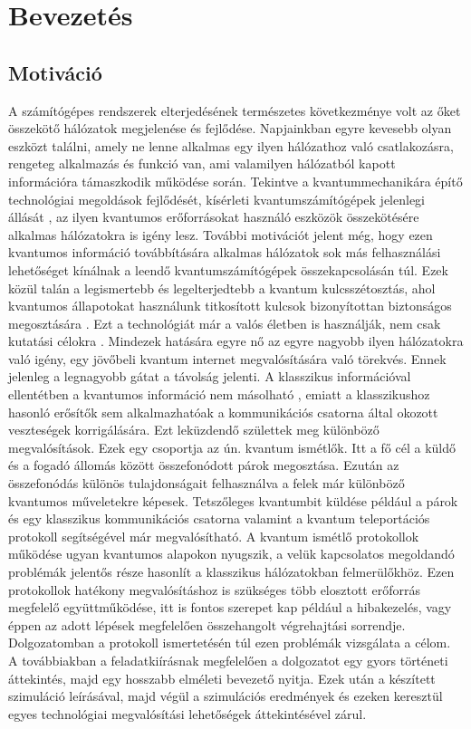 \chapter{Bevezetés}

\section{Motiváció}

A számítógépes rendszerek elterjedésének természetes következménye volt az őket összekötő hálózatok megjelenése és fejlődése. Napjainkban egyre kevesebb olyan eszközt találni, amely ne lenne alkalmas egy ilyen hálózathoz való csatlakozásra, rengeteg alkalmazás és funkció van, ami valamilyen hálózatból kapott információra támaszkodik működése során. Tekintve a kvantummechanikára építő technológiai megoldások fejlődését, kísérleti kvantumszámítógépek jelenlegi állását \cite{IBMQC}\cite{neill2017blueprint} , az ilyen kvantumos erőforrásokat használó eszközök összekötésére alkalmas hálózatokra is igény lesz. További motivációt jelent még, hogy ezen kvantumos információ továbbítására alkalmas hálózatok sok más felhasználási lehetőséget kínálnak a leendő kvantumszámítógépek összekapcsolásán túl. Ezek közül talán a legismertebb és legelterjedtebb a kvantum kulcsszétosztás, ahol kvantumos állapotokat használunk titkosított kulcsok bizonyítottan biztonságos megosztására \cite{BB84}. Ezt a technológiát már a valós életben is használják, nem csak kutatási célokra \cite{Swisselection}. Mindezek hatására egyre nő az egyre nagyobb ilyen hálózatokra való igény, egy jövőbeli kvantum internet \cite{kimble2008quantum} megvalósítására való törekvés. Ennek jelenleg a legnagyobb gátat a távolság jelenti. A klasszikus információval ellentétben a kvantumos információ nem másolható \cite{wootters1982single}, emiatt a klasszikushoz hasonló erősítők sem alkalmazhatóak a kommunikációs csatorna által okozott veszteségek korrigálására. Ezt leküzdendő születtek meg különböző megvalósítások. Ezek egy csoportja az ún. kvantum ismétlők. Itt a fő cél a küldő és a fogadó állomás között összefonódott párok megosztása. Ezután az összefonódás különös tulajdonságait felhasználva a felek már különböző kvantumos műveletekre képesek. Tetszőleges kvantumbit küldése például a párok és egy klasszikus kommunikációs csatorna valamint a kvantum teleportációs protokoll \cite{bennett1993teleporting} segítségével már megvalósítható. A kvantum ismétlő protokollok működése ugyan kvantumos alapokon nyugszik, a velük kapcsolatos megoldandó problémák jelentős része hasonlít a klasszikus hálózatokban felmerülőkhöz. Ezen protokollok hatékony megvalósításhoz is szükséges több elosztott erőforrás megfelelő együttműködése, itt is fontos szerepet kap például a hibakezelés, vagy éppen az adott lépések megfelelően összehangolt végrehajtási sorrendje. Dolgozatomban a protokoll ismertetésén túl ezen problémák vizsgálata a célom.\\
A továbbiakban a feladatkiírásnak megfelelően a dolgozatot egy gyors történeti áttekintés, majd egy hosszabb elméleti bevezető nyitja. Ezek után a készített szimuláció leírásával, majd végül a szimulációs eredmények és ezeken keresztül egyes technológiai megvalósítási lehetőségek áttekintésével zárul.



